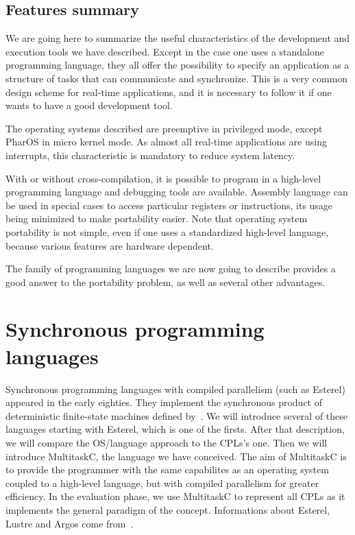 \documentclass[10pt]{report}
\begin{document}
\subsection{Features summary}

We are going here to summarize the useful characteristics of the development and execution tools we have described. Except
in the case one uses a standalone programming language, they all offer the possibility to specify an application as a structure of tasks
that can communicate and synchronize. This is a very common design scheme for real-time applications, and it is necessary to follow it 
if one wants to have a good development tool.

The operating systems described are preemptive in privileged mode, except PharOS in micro kernel mode. As almost all
real-time applications are using interrupts, this characteristic is mandatory to reduce system latency.

With or without cross-compilation, it is possible to program in a high-level programming language and debugging tools are available. 
Assembly language can be used in special cases to access particular registers or instructions, its usage being minimized to make 
portability easier. Note that operating system portability is not simple, even if one uses a standardized high-level language, because 
various features are hardware dependent.

The family of programming languages we are now going to describe provides a good answer to the portability problem, as well as several other advantages.

\section{Synchronous programming languages}

Synchronous programming languages with compiled parallelism (such as Esterel) appeared in the early eighties. They implement the synchronous product
of deterministic finite-state machines defined by~\cite{ArnoldNivat:82}. We will introduce several of these languages starting with
Esterel, which is one of the firsts. After that description, we will compare the OS/language approach to the CPLs's one. Then we will introduce MultitaskC, 
the language we have conceived. The aim of MultitaskC is to provide the programmer with the same capabilites as an operating system coupled to a high-level 
language, but with compiled parallelism for greater efficiency. In the evaluation phase, we use MultitaskC to represent all CPLs as it implements the general 
paradigm of the concept. Informations about Esterel, Lustre and Argos come from~\cite{Halbwachs:91}.
\end{document}
